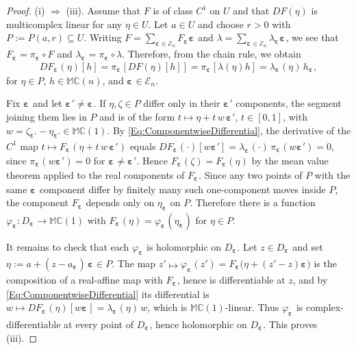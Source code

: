 \documentclass[12pt]{amsart}
\theoremstyle{plain}
\theoremstyle{definition}
\numberwithin{equation}{section}
\newcommand{\bep}[1]{\bm{\varepsilon_{#1}}}
\newcommand{\mC}{\mathbb{C}}
\newcommand{\mM}{\mathbb{M}}
\newcommand{\ra}{\rightarrow}
\newcommand{\Ra}{\Rightarrow}
\begin{document}
\begin{proof}
    (i) $\Ra$ (iii). Assume that $F$ is of class $C^1$ on $U$ and that $DF (\eta )$ is multicomplex linear for any $\eta \in U$. Let $a \in U$ and choose $r > 0$ with $P := P ( a , r ) \subseteq U$. Writing $F = \sum_{\bep{} \in \mathcal{E}_n} F_{\bep{}} \bep{}$ and $\lambda = \sum_{\bep{} \in \mathcal{E}_n} \lambda_{\bep{}} \bep{}$, we see that $F_{\bep{}} = \pi_{\bep{}} \circ F$ and $\lambda_{\bep{}} = \pi_{\bep{}} \circ \lambda$. Therefore, from the chain rule, we obtain
        \begin{equation}\label{Eq:ComponentwiseDifferential}
        D F_{\bep{}} (\eta ) [ h ] = \pi_{\bep{}} [DF (\eta ) [h] ] = \pi_{\bep{}} [\lambda (\eta ) h] = \lambda_{\bep{}} (\eta )\, h_{\bep{}} ,
        \end{equation}
    for $\eta \in P$, $h \in \mM \mC(n)$, and $ \bep{} \in \mathcal{E}_n$. 

    Fix $\bep{}$ and let $\bep{}' \neq \bep{}$. If $\eta , \zeta \in P$ differ only in
    their $\bep{}'$ components, the segment joining them lies in $P$ and is of
    the form $t \mapsto \eta + t\, w\, \bep{}'$, $t \in [ 0 , 1 ]$, with $w = \zeta_{\bep{}'} - \eta_{\bep{}'} \in \mM \mC (1)$.
    By \eqref{Eq:ComponentwiseDifferential}, the derivative of the $C^1$ map $t \mapsto F_{\bep{}} ( \eta + t\, w\, \bep{}' )$
    equals $D F_{\bep{}} ( \cdot ) [ w \bep{}' ] = \lambda_{\bep{}} ( \cdot )\,
    \pi_{\bep{}} ( w \bep{}' ) = 0$, since $\pi_{\bep{}} ( w \bep{}' ) = 0$ for $\bep{} \neq \bep{}'$. Hence
    $F_{\bep{}} ( \zeta ) = F_{\bep{}} ( \eta )$ by the mean value theorem applied to the real components of $F_{\bep{}}$. Since any two points of $P$ with the
    same $\bep{}$ component differ by finitely many such one-component moves
    inside $P$, the component $F_{\bep{}}$ depends only on $\eta_{\bep{}}$ on $P$. Therefore there is
    a function $\varphi_{\bep{}} : D_{\bep{}} \ra \mM \mC(1)$ with
    $F_{\bep{}} (\eta ) = \varphi_{\bep{}} ( \eta_{\bep{}} )$ for $\eta \in P$.

    It remains to check that each $\varphi_{\bep{}}$ is holomorphic on $D_{\bep{}}$. Let
    $z \in D_{\bep{}}$ and set $\eta := a + ( z - a_{\bep{}} )\, \bep{} \in P$. The map
    $z ' \mapsto \varphi_{\bep{}} ( z ' ) = F_{\bep{}} \big( \eta + ( z ' - z ) \bep{} \big)$
    is the composition of a real-affine map with $F_{\bep{}}$, hence is differentiable at $z$, and by \eqref{Eq:ComponentwiseDifferential} its
    differential is $w \mapsto D F_{\bep{}} (\eta ) [ w \bep{} ] =
    \lambda_{\bep{}} (\eta )\, w$, which is $\mM \mC(1)$-linear. Thus $\varphi_{\bep{}}$ is
    complex-differentiable at every point of $D_{\bep{}}$, hence holomorphic on
    $D_{\bep{}}$. This proves (iii).


\end{proof}
\end{document}
